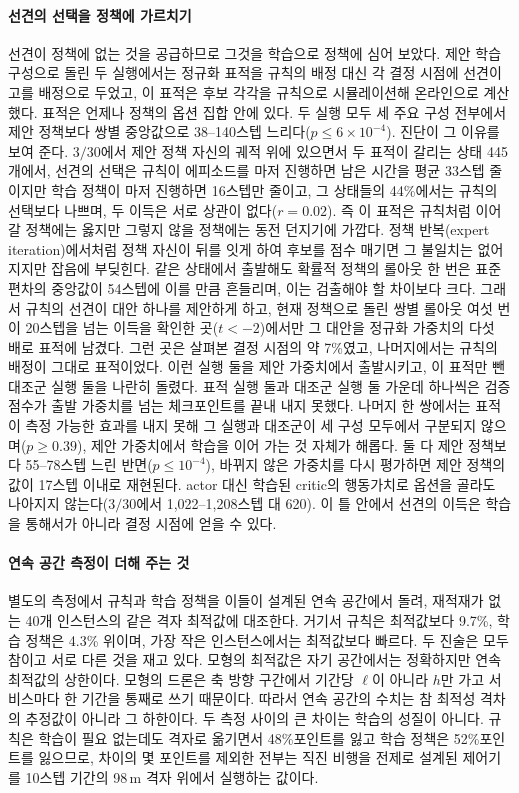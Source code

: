 \documentclass[final,5p,times,twocolumn]{elsarticle}
\begin{document}
\paragraph{선견의 선택을 정책에 가르치기}
선견이 정책에 없는 것을 공급하므로 그것을 학습으로 정책에 심어 보았다. 제안 학습 구성으로 돌린 두
실행에서는 정규화 표적을 규칙의 배정 대신 각 결정 시점에 선견이 고를 배정으로 두었고, 이 표적은 후보
각각을 규칙으로 시뮬레이션해 온라인으로 계산했다. 표적은 언제나 정책의 옵션 집합 안에 있다. 두 실행
모두 세 주요 구성 전부에서 제안 정책보다 쌍별 중앙값으로 38--140스텝
느리다($p \le 6 \times 10^{-4}$). 진단이 그 이유를 보여 준다. $3/30$에서 제안 정책 자신의 궤적 위에
있으면서 두 표적이 갈리는 상태 445개에서, 선견의 선택은 규칙이 에피소드를 마저 진행하면 남은 시간을
평균 33스텝 줄이지만 학습 정책이 마저 진행하면 16스텝만 줄이고, 그 상태들의 44\%에서는 규칙의
선택보다 나쁘며, 두 이득은 서로 상관이 없다($r = 0.02$). 즉 이 표적은 규칙처럼 이어 갈 정책에는
옳지만 그렇지 않을 정책에는 동전 던지기에 가깝다. 정책 반복(expert iteration)에서처럼 정책 자신이
뒤를 잇게 하여 후보를 점수 매기면 그 불일치는 없어지지만 잡음에 부딪힌다. 같은 상태에서 출발해도
확률적 정책의 롤아웃 한 번은 표준편차의 중앙값이 54스텝에 이를 만큼 흔들리며, 이는 검출해야 할
차이보다 크다. 그래서 규칙의 선견이 대안 하나를 제안하게 하고, 현재 정책으로 돌린 쌍별 롤아웃 여섯
번이 20스텝을 넘는 이득을 확인한 곳($t < -2$)에서만 그 대안을 정규화 가중치의 다섯 배로 표적에
남겼다. 그런 곳은 살펴본 결정 시점의 약 7\%였고, 나머지에서는 규칙의 배정이 그대로 표적이었다. 이런
실행 둘을 제안 가중치에서 출발시키고, 이 표적만 뺀 대조군 실행 둘을 나란히 돌렸다. 표적 실행 둘과
대조군 실행 둘 가운데 하나씩은 검증 점수가 출발 가중치를 넘는 체크포인트를 끝내 내지 못했다. 나머지
한 쌍에서는 표적이 측정 가능한 효과를 내지 못해 그 실행과 대조군이 세 구성 모두에서 구분되지
않으며($p \ge 0.39$), 제안 가중치에서 학습을 이어 가는 것 자체가 해롭다. 둘 다 제안 정책보다
55--78스텝 느린 반면($p \le 10^{-4}$), 바뀌지 않은 가중치를 다시 평가하면 제안 정책의 값이 17스텝
이내로 재현된다. actor 대신 학습된 critic의 행동가치로 옵션을 골라도 나아지지 않는다($3/30$에서
1{,}022--1{,}208스텝 대 620). 이 틀 안에서 선견의 이득은 학습을 통해서가 아니라 결정 시점에 얻을 수
있다.

\paragraph{연속 공간 측정이 더해 주는 것}
별도의 측정에서 규칙과 학습 정책을 이들이 설계된 연속 공간에서 돌려, 재적재가 없는 40개 인스턴스의
같은 격자 최적값에 대조한다. 거기서 규칙은 최적값보다 9.7\%, 학습 정책은 4.3\% 위이며, 가장 작은
인스턴스에서는 최적값보다 빠르다. 두 진술은 모두 참이고 서로 다른 것을 재고 있다. 모형의 최적값은
자기 공간에서는 정확하지만 연속 최적값의 상한이다. 모형의 드론은 축 방향 구간에서 기간당 $\ell$이
아니라 $h$만 가고 서비스마다 한 기간을 통째로 쓰기 때문이다. 따라서 연속 공간의 수치는 참 최적성
격차의 추정값이 아니라 그 하한이다. 두 측정 사이의 큰 차이는 학습의 성질이 아니다. 규칙은 학습이
필요 없는데도 격자로 옮기면서 48\%포인트를 잃고 학습 정책은 52\%포인트를 잃으므로, 차이의 몇
포인트를 제외한 전부는 직진 비행을 전제로 설계된 제어기를 10스텝 기간의 98\,m 격자 위에서 실행하는
값이다.
\end{document}
